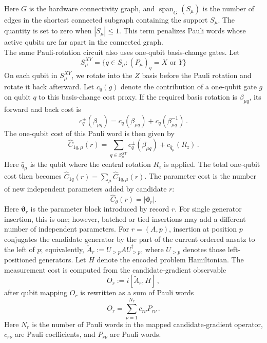 \documentclass[
  reprint,
  amsmath,
  amssymb,
  aps,
  pra,
  nofootinbib,
  superscriptaddress,
  floatfix
]{revtex4-2}
\begin{document}
Here \(G\) is the hardware connectivity graph, and $\operatorname{span}_{G}(S_{\mu})$ is the number of edges in the shortest connected subgraph containing the support \(S_{\mu}\). The quantity is set to zero when $|S_{\mu}|\le1$. This term penalizes Pauli words whose active qubits are far apart in the connected graph.\\
\noindent
The same Pauli-rotation circuit also uses one-qubit basis-change gates. Let
\[
S_{\mu}^{XY} = \{q\in S_{\mu}:(P_{\mu})_q = X\text{ or }Y\}
\]
On each qubit in \(S_{\mu}^{XY}\), we rotate into the \(Z\) basis before the Pauli rotation and rotate it back afterward. Let \(c_q(g)\) denote the contribution of a one-qubit gate \(g\) on qubit \(q\) to this basis-change cost proxy. If the required basis rotation is $\beta_{\mu q}$, its forward and back cost is
\[
c_q^{\pm}(\beta_{\mu q})=c_q(\beta_{\mu q})+c_q(\beta^{-1}_{\mu q})\,.
\]
The one-qubit cost of this Pauli word is then given by
%
\begin{equation*}
\widehat{C}_{1q,\mu}(r) = \sum_{q\in S_{\mu}^{XY}}c_q^\pm(\beta_{\mu q}) + c_{\bar{q}_{\mu}}(R_z)\,.
\end{equation*}
Here \(\bar{q}_{\mu}\) is the qubit where the central rotation \(R_z\) is applied. The total one-qubit cost then becomes \(\widehat{C}_{1q}(r)=\sum_\mu\widehat{C}_{1q,\mu}(r)\). The parameter cost is the number of new independent parameters added by candidate \(r\):
\begin{equation*}
\widehat C_\theta(r)
=
|\boldsymbol\vartheta_r|.
\end{equation*}
%
Here \(\boldsymbol\vartheta_r\) is the parameter block introduced by record \(r\). For single generator insertion, this is one; however, batched or tied insertions may add a different number of independent parameters. For \(r=(A,p)\), insertion at position \(p\) conjugates the candidate generator by the part of the current ordered ansatz to the left of \(p\); equivalently, \(\widetilde A_r:=U_{>p}AU_{>p}^{\dagger}\), where \(U_{>p}\) denotes those left-positioned generators. Let \(H\) denote the encoded problem Hamiltonian. The measurement cost is computed from the candidate-gradient observable \cite{Verteletskyi2020CliqueCover,Yen2020CompatibleMeasurements}
\[
O_r:=i[\widetilde A_r,H]\,,
\]
after qubit mapping \(O_r\) is rewritten as a sum of Pauli words 
%
\[
O_r=\sum_{\nu=1}^{N_r}c_{r\nu}P_{r\nu}\,.
\]
%
Here \(N_r\) is the number of Pauli words in the mapped candidate-gradient operator, \(c_{r\nu}\) are Pauli coefficients, and \(P_{r\nu}\) are Pauli words.
\end{document}
